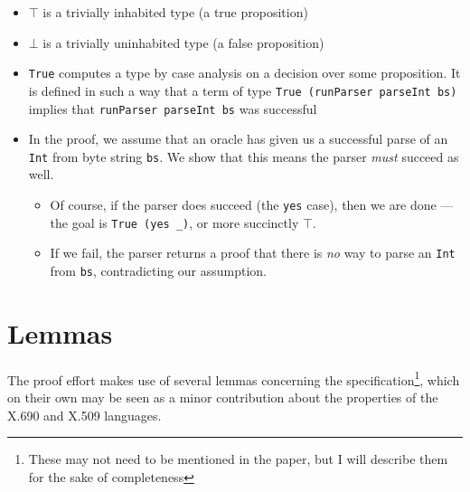 \documentclass[11pt]{article}
\begin{document}
\begin{itemize}
\item \(\top\) is a trivially inhabited type (a true proposition)
\item \(\bot\) is a trivially uninhabited type (a false proposition)
\item \texttt{True} computes a type by case analysis on a decision over some
proposition. It is defined in such a way that a term of type
\texttt{True (runParser parseInt bs)} implies that \texttt{runParser parseInt bs} was
successful

\item In the proof, we assume that an oracle has given us a successful parse of
an \texttt{Int} from byte string \texttt{bs}. We show that this means the parser \emph{must}
succeed as well.

\begin{itemize}
\item Of course, if the parser does succeed (the \texttt{yes} case), then we are done
--- the goal is \texttt{True (yes \_)}, or more succinctly \(\top\).
\item If we fail, the parser returns a proof that there is \emph{no} way to parse
an \texttt{Int} from \texttt{bs}, contradicting our assumption.
\end{itemize}
\end{itemize}

\section{Lemmas}
\label{sec:orgba17c8e}

The proof effort makes use of several lemmas concerning the
specification\footnote{These may not need to be mentioned in the paper, but I will
describe them for the sake of completeness}, which on their own may be seen
as a minor contribution about the properties of the X.690 and X.509 languages.
\end{document}
